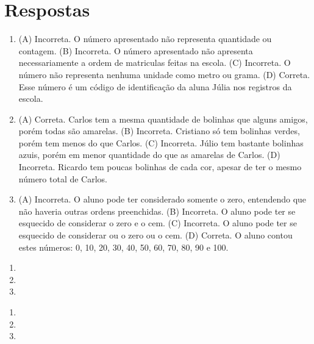 \chapter{Respostas}
\pagestyle{plain}
\footnotesize

\pagecolor{gray!40}


\begin{enumerate}
\item
(A) Incorreta. O número apresentado não representa quantidade ou contagem.
(B) Incorreta. O número apresentado não apresenta necessariamente a ordem de matriculas feitas na escola.
(C) Incorreta. O número não representa nenhuma unidade como metro ou grama.
(D) Correta. Esse número é um código de identificação da aluna Júlia nos registros da escola.

\item
(A) Correta. Carlos tem a mesma quantidade de bolinhas que alguns amigos, porém todas são amarelas.
(B) Incorreta. Cristiano só tem bolinhas verdes, porém tem menos do que Carlos.
(C) Incorreta. Júlio tem bastante bolinhas azuis, porém em menor quantidade do que as amarelas de Carlos.
(D) Incorreta. Ricardo tem poucas bolinhas de cada cor, apesar de ter o mesmo número total de Carlos.

\item
(A)  Incorreta. O aluno pode ter considerado somente o zero, entendendo que não haveria outras ordens preenchidas.
(B)  Incorreta. O aluno pode ter se esquecido de considerar o zero e o cem.
(C)  Incorreta. O aluno pode ter se esquecido de considerar ou o zero ou o cem.
(D)  Correta. O aluno contou estes números: 0, 10, 20, 30, 40, 50, 60, 70, 80, 90 e 100.
\end{enumerate}


\begin{enumerate}
\item

\item

\item
\end{enumerate}


\begin{enumerate}
\item

\item

\item
\end{enumerate}

